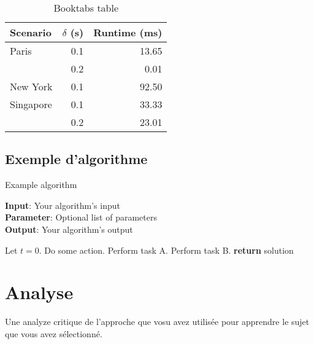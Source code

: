 \documentclass{article}
\begin{document}
\begin{table}
\centering
\begin{tabular}{lrr}  
\toprule
Scenario  & $\delta$ (s) & Runtime (ms) \\
\midrule
Paris       & 0.1  & 13.65      \\
            & 0.2  & 0.01       \\
New York    & 0.1  & 92.50      \\
Singapore   & 0.1  & 33.33      \\
            & 0.2  & 23.01      \\
\bottomrule
\end{tabular}
\caption{Booktabs table}
\label{tab:booktabs}
\end{table}

\subsection{Exemple d'algorithme}

\begin{algorithm}[tb]
\caption{Example algorithm}
\label{alg:algorithm}
\textbf{Input}: Your algorithm's input\\
\textbf{Parameter}: Optional list of parameters\\
\textbf{Output}: Your algorithm's output
\begin{algorithmic}[1] %
\STATE Let $t=0$.
\STATE Do some action.
\STATE Perform task A.
\ELSE
\STATE Perform task B.
\ENDIF
\ENDWHILE
\STATE \textbf{return} solution
\end{algorithmic}
\end{algorithm}

\section{Analyse}

Une analyze critique de l'approche que vosu avez utilisée pour apprendre le sujet que vous avez sélectionné.




\end{document}
